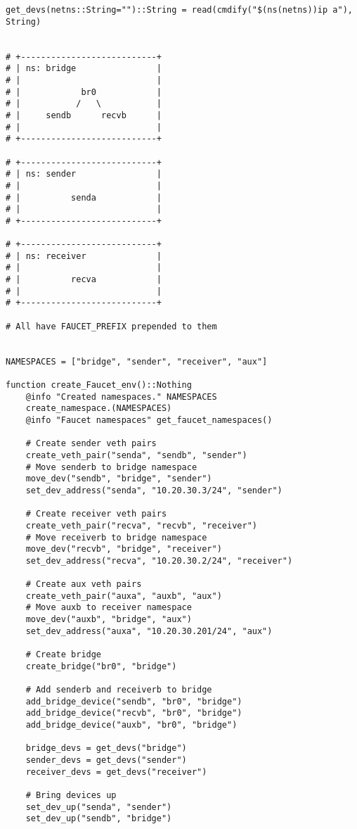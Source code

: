 \begin{lstlisting}[language=JuliaLocal, style=julia]
get_devs(netns::String="")::String = read(cmdify("$(ns(netns))ip a"), String)


# +---------------------------+
# | ns: bridge                |
# |                           |
# |            br0            |
# |           /   \           |
# |     sendb      recvb      |
# |                           |
# +---------------------------+

# +---------------------------+
# | ns: sender                |
# |                           |
# |          senda            |
# |                           |
# +---------------------------+

# +---------------------------+
# | ns: receiver              |
# |                           |
# |          recva            |
# |                           |
# +---------------------------+

# All have FAUCET_PREFIX prepended to them


NAMESPACES = ["bridge", "sender", "receiver", "aux"]

function create_Faucet_env()::Nothing
    @info "Created namespaces." NAMESPACES
    create_namespace.(NAMESPACES)
    @info "Faucet namespaces" get_faucet_namespaces()

    # Create sender veth pairs
    create_veth_pair("senda", "sendb", "sender")
    # Move senderb to bridge namespace
    move_dev("sendb", "bridge", "sender")
    set_dev_address("senda", "10.20.30.3/24", "sender")

    # Create receiver veth pairs
    create_veth_pair("recva", "recvb", "receiver")
    # Move receiverb to bridge namespace
    move_dev("recvb", "bridge", "receiver")
    set_dev_address("recva", "10.20.30.2/24", "receiver")

    # Create aux veth pairs
    create_veth_pair("auxa", "auxb", "aux")
    # Move auxb to receiver namespace
    move_dev("auxb", "bridge", "aux")
    set_dev_address("auxa", "10.20.30.201/24", "aux")

    # Create bridge
    create_bridge("br0", "bridge")

    # Add senderb and receiverb to bridge
    add_bridge_device("sendb", "br0", "bridge")
    add_bridge_device("recvb", "br0", "bridge")
    add_bridge_device("auxb", "br0", "bridge")

    bridge_devs = get_devs("bridge")
    sender_devs = get_devs("sender")
    receiver_devs = get_devs("receiver")

    # Bring devices up
    set_dev_up("senda", "sender")
    set_dev_up("sendb", "bridge")


\end{lstlisting}
